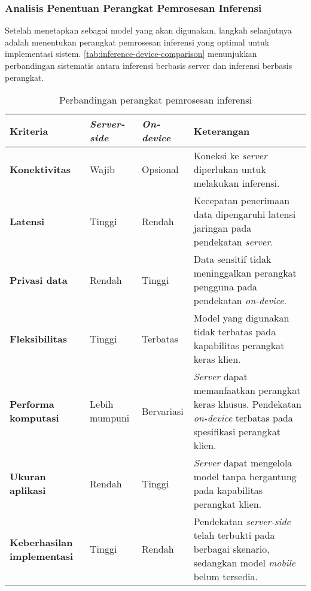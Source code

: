 \subsubsection{Analisis Penentuan Perangkat Pemrosesan Inferensi}
\label{subsubsec:analisis-penentuan-perangkat-pemrosesan-inferensi}

Setelah menetapkan \donut{} sebagai model yang akan digunakan, langkah selanjutnya adalah menentukan perangkat pemrosesan inferensi yang optimal untuk implementasi sistem. \autoref{tab:inference-device-comparison} menunjukkan perbandingan sistematis antara inferensi berbasis server dan inferensi berbasis perangkat.

\begin{table}[h!]
\caption{Perbandingan perangkat pemrosesan inferensi}
\label{tab:inference-device-comparison}
\begin{tabularx}{\linewidth}{|p{3cm}|p{2cm}|p{2cm}|X|}
\hline
\textbf{Kriteria} & \textbf{\emph{Server-side}} & \textbf{\emph{On-device}} & \textbf{Keterangan} \\
\hline
\textbf{Konektivitas} & Wajib & Opsional & Koneksi ke \emph{server} diperlukan untuk melakukan inferensi. \\
\hline
\textbf{Latensi} & Tinggi & Rendah & Kecepatan penerimaan data dipengaruhi latensi jaringan pada pendekatan \emph{server}. \\
\hline
\textbf{Privasi data} & Rendah & Tinggi & Data sensitif tidak meninggalkan perangkat pengguna pada pendekatan \emph{on-device}. \\
\hline
\textbf{Fleksibilitas} & Tinggi & Terbatas & Model yang digunakan tidak terbatas pada kapabilitas perangkat keras klien. \\
\hline
\textbf{Performa komputasi} & Lebih mumpuni & Bervariasi & \emph{Server} dapat memanfaatkan perangkat keras khusus. Pendekatan \emph{on-device} terbatas pada spesifikasi perangkat klien. \\
\hline
\textbf{Ukuran aplikasi} & Rendah & Tinggi & \emph{Server} dapat mengelola model tanpa bergantung pada kapabilitas perangkat klien. \\
\hline
\textbf{Keberhasilan implementasi} & Tinggi & Rendah & Pendekatan \emph{server-side} telah terbukti pada berbagai skenario, sedangkan model \emph{mobile} belum tersedia. \\
\hline
\end{tabularx}
\end{table}


